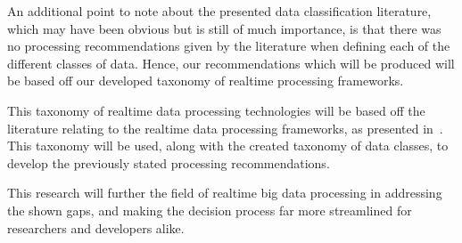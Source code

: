 \documentclass[a4paper,11pt]{article}
\begin{document}
An additional point to note about the presented data classification literature, which may have been obvious but is still
of much importance, is that there was no processing recommendations given by the literature when defining each of the
different classes of data. Hence, our recommendations which will be produced will be based off our developed taxonomy of
realtime processing frameworks.

This taxonomy of realtime data processing technologies will be based off the literature relating to the realtime data
processing frameworks, as presented in~. This taxonomy will be used, along with the
created taxonomy of data classes, to develop the previously stated processing recommendations.

This research will further the field of realtime big data processing in addressing the shown gaps, and making the
decision process far more streamlined for researchers and developers alike.


\newpage



\end{document}
